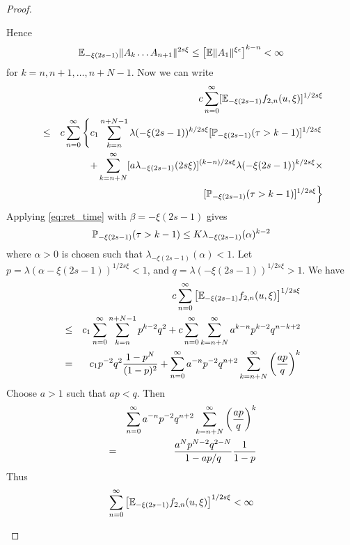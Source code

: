 \documentclass{article}
\begin{document}
\begin{proof}
\begin{enumerate}
\begin{enumerate}
\begin{enumerate}
\[        \]
        Hence
        \[
        \E_{-\xi(2s - 1)} \|A_k \dots A_{n+1}\|^{2s\xi} \leq
        \left[
          \E \|A_1\|^{\xi \epsilon}
        \right]^{k-n} < \infty      
        \]
        for $k=n, n+1, \dots, n+N-1$. Now we can write
        \begin{eqnarray*}
          && c \sum_{n=0}^\infty [\E_{-\xi(2s - 1)} f_{2,n}(u,\xi)]^{1/2s\xi} \\
          &\leq& c \sum_{n=0}^\infty \left\{
                 c_1 \sum_{k=n}^{n+N-1} \lambda(-\xi(2s - 1))^{k/2s\xi} [\P_{-\xi(2s -
                 1)}(\tau > k-1)]^{1/2s\xi} \right.\\
          && + \sum_{k=n+N}^\infty [a \lambda_{-\xi(2s - 1)}(2s\xi)]^{(k-n)/2s\xi}
             \lambda(-\xi(2s - 1))^{k/2s\xi} \times \\
          && \left.[\P_{-\xi(2s - 1)}(\tau > k-1)]^{1/2s\xi}
             \right\}
        \end{eqnarray*}
        Applying \eqref{eq:ret_time} with $\beta = -\xi(2s - 1)$ gives
        \[
        \P_{-\xi(2s - 1)}(\tau > k-1) \leq K \lambda_{-\xi(2s - 1)}(\alpha)^{k-2}
        \]
        where $\alpha > 0$ is chosen such that $\lambda_{-\xi(2s -
          1)}(\alpha) < 1$.
        Let $p = \lambda(\alpha - \xi(2s - 1))^{1/2s\xi} < 1$, and $q =
        \lambda(-\xi(2s - 1))^{1/2s\xi} > 1$. We have
        \begin{eqnarray*}
          && c \sum_{n=0}^\infty \left[
             \E_{-\xi(2s - 1)} f_{2,n}(u,\xi)
             \right]^{1/2s\xi} \\
          &\leq& c_1 \sum_{n=0}^\infty \sum_{k=n}^{n+N-1} p^{k-2} q^{2} +
                 c \sum_{n=0}^{\infty} \sum_{k=n+N}^\infty a^{k-n} p^{k-2}
                 q^{n-k+2} \\
          &=& c_1 p^{-2} q^2 {1 - p^N \over (1-p)^2 }
              + \sum_{n=0}^{\infty} a^{-n} p^{-2} q^{n+2} \sum_{k=n+N}^{\infty}
              \left({ap \over q}\right)^k
        \end{eqnarray*}
        Choose $a > 1$ such that $ap < q$. Then
        \begin{eqnarray*}
          && \sum_{n=0}^{\infty} a^{-n} p^{-2} q^{n+2} \sum_{k=n+N}^{\infty}
             \left({ap \over q}\right)^k \\
          &=& \frac{
              a^N p^{N-2} q^{2-N}
              }{
              1 - ap/q
              } {1 \over 1 - p}
        \end{eqnarray*}
        Thus
        \[
        \sum_{n=0}^\infty \left[
          \E_{-\xi(2s - 1)} f_{2,n}(u,\xi)
        \right]^{1/2s\xi} < \infty  
        \]


\end{enumerate}
\end{enumerate}
\end{enumerate}
\end{proof}
\end{document}
